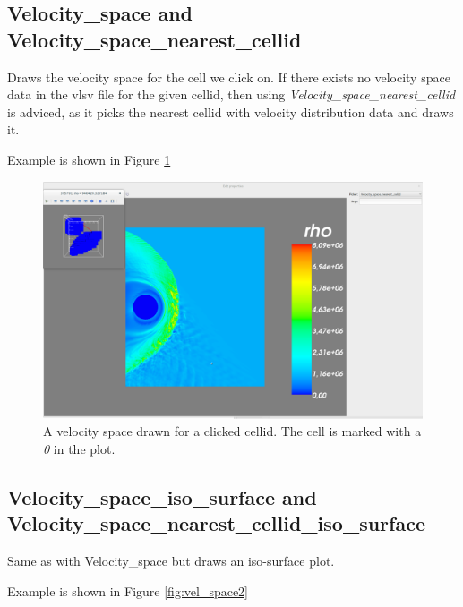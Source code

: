 \documentclass[a4paper,10pt]{article}
\begin{document}
\newpage

\subsection{Velocity\_space and Velocity\_space\_nearest\_cellid}

Draws the velocity space for the cell we click on. If there exists no velocity space data in the vlsv 
file for the given cellid, then using \emph{Velocity\_space\_nearest\_cellid} is adviced, as it picks the 
nearest cellid with velocity distribution data and draws it.

Example is shown in Figure \ref{fig:vel_space}

\begin{figure}[H]
 \centering
 \includegraphics[width=\textwidth]{images/velocity_space_nearest_cellid.png}
 \caption{A velocity space drawn for a clicked cellid. The cell is marked with a \emph{0} in the plot.}
 \label{fig:vel_space}
\end{figure}


\subsection{Velocity\_space\_iso\_surface and Velocity\_space\_nearest\_cellid\_iso\_surface}

Same as with Velocity\_space but draws an iso-surface plot.

Example is shown in Figure \ref{fig:vel_space2}
\end{document}
